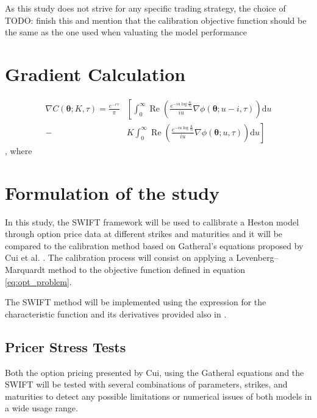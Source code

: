 \documentclass[12,twoside]{mammeTFM}
\theoremstyle{definition}
\theoremstyle{remark}
\begin{document}
As this study does not strive for any specific trading strategy, the choice of TODO: finish this and mention that the calibration objective function should be the same as the one used when valuating the model performance \cite{chr02}


\section{Gradient Calculation} \label{sec:gradient}

\begin{equation}
\begin{aligned}
\nabla C(\boldsymbol{\theta} ; K, \tau)=\frac{e^{-r \tau}}{\pi} &\left[\int_{0}^{\infty} \operatorname{Re}\left(\frac{e^{-i u \log \frac{K}{s_{0}}}}{i u} \nabla \phi(\boldsymbol{\theta} ; u-i, \tau)\right) \mathrm{d} u\right.\\
-&\left.K \int_{0}^{\infty} \operatorname{Re}\left(\frac{e^{-i u \log \frac{K}{s_{0}}}}{i u} \nabla \phi(\boldsymbol{\theta} ; u, \tau)\right) \mathrm{d} u\right]
\end{aligned}
\end{equation}
, where 

\section{Formulation of the study}

In this study, the SWIFT framework will be used to callibrate a Heston model through option price data at different strikes and maturities and it will be compared to the calibration method based on Gatheral's equations proposed by Cui et al. \cite{cui17}. The calibration process will consist on applying a Levenberg–Marquardt method to the objective function defined in equation \ref{eq:opt_problem}.

The SWIFT method will be implemented using the expression for the characteristic function and its derivatives provided also in \cite{cui17}.

\subsection{Pricer Stress Tests}
Both the option pricing presented by Cui, using the Gatheral equations \cite{cui17} and the SWIFT will be tested with several combinations of parameters, strikes, and maturities to detect any possible limitations or numerical issues of both models in a wide usage range.
\end{document}
